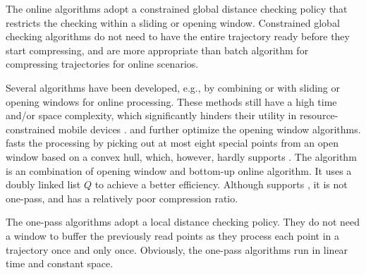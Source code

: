 The online algorithms adopt a constrained global distance checking policy that restricts the checking within a sliding or opening window.
Constrained global checking algorithms do not need to have the entire trajectory ready before they start compressing, and are more appropriate than batch algorithm for compressing trajectories for online scenarios.

Several \lsa algorithms have been developed, e.g., by combining \dpa or \pavlidis with sliding or opening windows for online processing\cite{Meratnia:Spatiotemporal}. %
These methods still have a high time and/or space complexity, which significantly hinders their utility in resource-constrained mobile devices \cite{Liu:BQS}.
%
\bqsa \cite{Liu:BQS, Liu:Amnesic} and \squishe\cite{Muckell:Compression} further optimize the opening window algorithms.
%
\bqsa \cite{Liu:BQS, Liu:Amnesic} fasts the processing by picking out at most eight special points from an open window based on a convex hull, which, however, hardly supports \sed.
The \squishe\cite{Muckell:Compression} algorithm is an combination of {opening} window and bottom-up online algorithm. It uses a doubly linked list $Q$ to achieve a better efficiency. Although \squishe supports \sed, it is not one-pass, and has a relatively poor compression ratio.

The one-pass algorithms adopt a local distance checking policy.
They do not need a window to buffer the previously read points as they process each point in a trajectory once and only once.
Obviously, the one-pass algorithms run in linear time and constant space.
%

